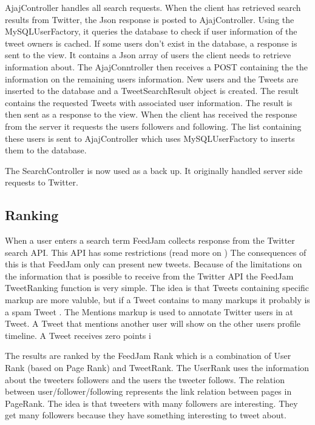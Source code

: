 AjajController handles all search requests. When the client has retrieved search results from Twitter, the Json response is posted to AjajController. Using the MySQLUserFactory, it queries the database to check if user information of the tweet owners is cached. If some users don't exist in the database, a response is sent to the view. It contains a Json array of users the client needs to retrieve information about. 
The AjajConntroller then receives a POST containing the the information on the remaining users information. New users and the Tweets are inserted to the database and a TweetSearchResult object is created. The result contains the requested Tweets with associated user information. The result is then sent as a response to the view. When the client has received the response from the server it requests the users followers and following. The list containing these users is sent to AjajController which uses MySQLUserFactory to inserts them to the database. 

The SearchController is now used as a back up. It originally handled server side requests to Twitter. %




\subsection{Ranking} %
\label{ranking}
When a user enters a search term FeedJam collects response from the Twitter search API. This API has some restrictions (read more on )%
The consequences of this is that FeedJam only can present new tweets. Because of the limitations on the information that is possible to receive from the Twitter API the FeedJam TweetRanking function is very simple. The idea is that Tweets containing specific markup are more valuble, but if a Tweet contains to many markups it probably is a spam Tweet \citep{}.%
The Mentions markup is used to annotate Twitter users in at Tweet. A Tweet that mentions another user will show on the other users profile timeline.
A Tweet receives zero points i

The results are ranked by the FeedJam Rank which is a combination of User Rank (based on Page Rank) and TweetRank. The UserRank uses the information about the tweeters followers and the users the tweeter follows. The relation between user/follower/following represents the link relation between pages in PageRank. The idea is that tweeters with many followers are interesting. They get many followers because they have something interesting to tweet about. 

